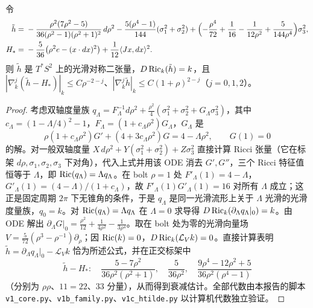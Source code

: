\begin{lemma}[显式核心修正]\label{lem:core}
令
\begin{align*}
\tilde h={}&-\frac{\rho^2(7\rho^2-5)}{36(\rho^2-1)(\rho^2+1)^2}\,d\rho^2-\frac{5(\rho^4-1)}{144}(\sigma_1^2+\sigma_2^2)
+\Bigl(-\frac{\rho^4}{72}+\frac1{16}-\frac{1}{12\rho^{2}}+\frac{5}{144\rho^{4}}\Bigr)\sigma_3^2,\\
H_*={}&-\frac5{36}\bigl(\rho^2e-(x\cdot dx)^2\bigr)+\frac1{12}\langle Jx,dx\rangle^2 .
\end{align*}
则 $\tilde h$ 是 $T^*S^2$ 上的光滑对称二张量，$D\operatorname{Ric}_k(\tilde h)=k$，且 $|\nabla_k^j(\tilde h-H_*)|_k\le C\rho^{-2-j}$、$|\nabla_k^j\tilde h|_k\le C(1+\rho)^{2-j}$（$j=0,1,2$）。
\end{lemma}
\begin{proof}
考虑双轴度量族 $q_\Lambda=F_\Lambda^{-1}d\rho^2+\frac{\rho^2}{4}(\sigma_1^2+\sigma_2^2+G_\Lambda\sigma_3^2)$，其中 $c_\Lambda=(1-\Lambda/4)^2-1$，$F_\Lambda=(1+c_\Lambda\rho^2)G_\Lambda$，$G_\Lambda$ 是
\[
\rho(1+c_\Lambda\rho^2)G'+(4+3c_\Lambda\rho^2)G=4-\Lambda\rho^2,\qquad G(1)=0
\]
的解。对一般双轴度量 $X\,d\rho^2+Y(\sigma_1^2+\sigma_2^2)+Z\sigma_3^2$ 直接计算 Ricci 张量（它在标架 $d\rho,\sigma_1,\sigma_2,\sigma_3$ 下对角），代入上式并用该 ODE 消去 $G',G''$，三个 Ricci 特征值恒等于 $\Lambda$，即 $\operatorname{Ric}(q_\Lambda)=\Lambda q_\Lambda$。在 bolt $\rho=1$ 处 $F'_\Lambda(1)=4-\Lambda$，$G'_\Lambda(1)=(4-\Lambda)/(1+c_\Lambda)$，故 $F'_\Lambda(1)G'_\Lambda(1)=16$ 对所有 $\Lambda$ 成立；这正是固定周期 $2\pi$ 下无锥角的条件，于是 $q_\Lambda$ 是同一光滑流形上关于 $\Lambda$ 光滑的光滑度量族，$q_0=k$。对 $\operatorname{Ric}(q_\Lambda)=\Lambda q_\Lambda$ 在 $\Lambda=0$ 求导得 $D\operatorname{Ric}_k(\partial_\Lambda q_\Lambda|_0)=k$。由 ODE 解出 $\partial_\Lambda G|_0=\frac{\rho^2}{12}+\frac1{4\rho^2}-\frac1{3\rho^4}$。取在 bolt 处为零的光滑向量场 $V=\frac5{72}(\rho^3-\rho^{-1})\partial_\rho$；因 $\operatorname{Ric}(k)=0$，$D\operatorname{Ric}_k(\mathcal L_Vk)=0$。直接计算表明 $\tilde h=\partial_\Lambda q_\Lambda|_0-\mathcal L_Vk$ 恰为所述公式，并在正交标架中
\[
\tilde h-H_*:\quad \frac{5-7\rho^2}{36\rho^2(\rho^2+1)},\quad \frac5{36\rho^2},\quad \frac{9\rho^4-12\rho^2+5}{36\rho^2(\rho^4-1)}
\]
（分别为 $\rho\rho$、$11=22$、$33$ 分量），从而得到衰减估计。全部代数由本报告的脚本 \texttt{v1\_core.py}、\texttt{v1b\_family.py}、\texttt{v1c\_htilde.py} 以计算机代数独立验证。
\end{proof}

